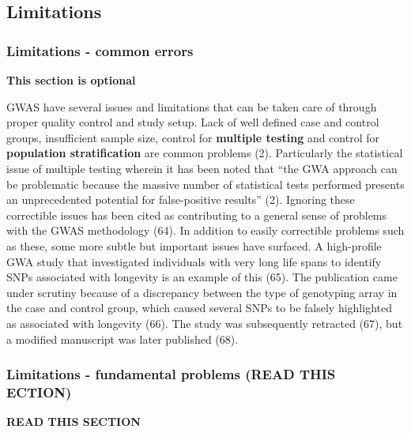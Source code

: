 \documentclass[
]{book}
\begin{document}
\hypertarget{limitations}{%
\subsection{Limitations}\label{limitations}}

\hypertarget{limitations---common-errors}{%
\subsubsection{Limitations - common errors}\label{limitations---common-errors}}

\textbf{This section is optional}

GWAS have several issues and limitations that can be taken care of through proper quality control and study setup. Lack of well defined case and control groups, insufficient sample size, control for \textbf{multiple testing} and control for \textbf{population stratification} are common problems (2). Particularly the statistical issue of multiple testing wherein it has been noted that ``the GWA approach can be problematic because the massive number of statistical tests performed presents an unprecedented potential for false-positive results'' (2). Ignoring these correctible issues has been cited as contributing to a general sense of problems with the GWAS methodology (64). In addition to easily correctible problems such as these, some more subtle but important issues have surfaced. A high-profile GWA study that investigated individuals with very long life spans to identify SNPs associated with longevity is an example of this (65). The publication came under scrutiny because of a discrepancy between the type of genotyping array in the case and control group, which caused several SNPs to be falsely highlighted as associated with longevity (66). The study was subsequently retracted (67), but a modified manuscript was later published (68).

\hypertarget{limitations---fundamental-problems-read-this-ection}{%
\subsubsection{Limitations - fundamental problems (READ THIS ECTION)}\label{limitations---fundamental-problems-read-this-ection}}

\textbf{READ THIS SECTION}
\end{document}
